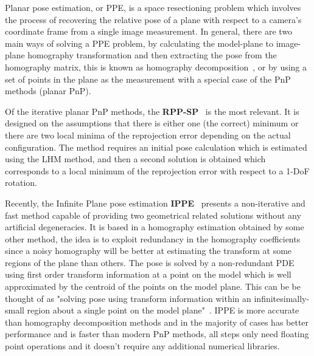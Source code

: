 \documentclass[letterpaper, 10 pt, conference]{ieeeconf}  %
\begin{document}
Planar pose estimation, or PPE, is a space resectioning problem which involves the process of recovering the relative pose of a plane with respect to a camera's coordinate frame from a single image measurement.  In general, there are two main ways of solving a PPE problem, by calculating the model-plane to image-plane homography transformation and then extracting the pose from the homography matrix, this is known as homography decomposition~\cite{Sturm2000,Zhang2000}, or by using a set of points in the plane as the measurement with a special case of the PnP methods (planar PnP).

Of the iterative planar PnP methods, the \textbf{RPP-SP}~\cite{Schweighofer2006} is the most relevant. It is designed on the assumptions that there is either one (the correct) minimum or there are two local minima of the reprojection error depending on the actual configuration. The method requires an initial pose calculation which is estimated using the LHM method, and then a second solution is obtained which corresponds to a local minimum of the reprojection error with respect to a 1-DoF rotation.  %

Recently, the Infinite Plane pose estimation \textbf{IPPE}~\cite{Collins2014} presents a non-iterative and fast method capable of providing two geometrical related solutions without any artificial degeneracies. It is based in a homography estimation obtained by some other method, the idea is to exploit redundancy in the homography coefficients since a noisy homography will be better at estimating the transform at some regions of the plane than others. The pose is solved by a non-redundant PDE using first order transform information at a point on the model which is well approximated by the centroid of the points on the model plane. This can be be thought of as "solving pose using transform information within an infinitesimally-small region about a single point on the model plane"~\cite{Collins2014}. IPPE is more accurate than homography decomposition methods and in the  majority of cases has better performance and is faster than modern PnP methods, all steps only need floating point operations and it doesn't require any additional numerical libraries.
\end{document}
